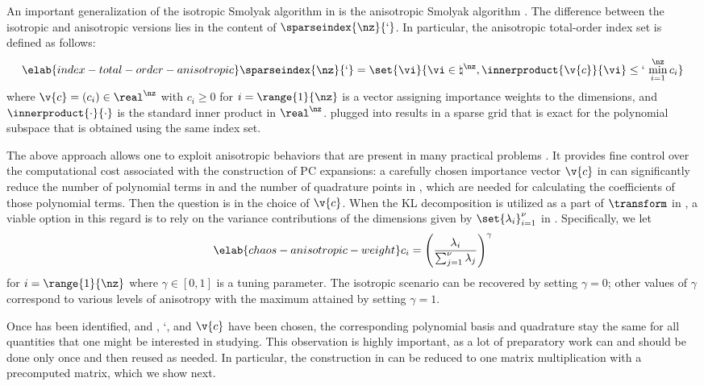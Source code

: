 An important generalization of the isotropic Smolyak algorithm in
 is the anisotropic Smolyak algorithm \cite{nobile2008}.
The difference between the isotropic and anisotropic versions lies in the
content of $\sparseindex{\nz}{\lq}$. In particular, the anisotropic total-order
index set is defined as follows:
\begin{equation} \elab{index-total-order-anisotropic}
  \sparseindex{\nz}{\lq} = \set{\vi}{\vi \in \natural^\nz, \innerproduct{\v{c}}{\vi} \leq \lq \, \min_{i = 1}^\nz c_i}
\end{equation}
where $\v{c} = (c_i) \in \real^\nz$ with $c_i \geq 0$ for $i = \range{1}{\nz}$
is a vector assigning importance weights to the dimensions, and
$\innerproduct{\cdot}{\cdot}$ is the standard inner product in $\real^\nz$.
 plugged into 
results in a sparse grid that is exact for the polynomial subspace that is
obtained using the same index set.

The above approach allows one to exploit anisotropic behaviors that are present
in many practical problems \cite{nobile2008}. It provides fine control over the
computational cost associated with the construction of \ac{PC} expansions: a
carefully chosen importance vector $\v{c}$ in
 can significantly reduce the number of
polynomial terms in  and the number of quadrature points
in , which are needed for calculating the coefficients
of those polynomial terms. Then the question is in the choice of $\v{c}$. When
the \ac{KL} decomposition is utilized as a part of $\transform$ in
, a viable option in this regard is to rely on the
variance contributions of the dimensions given by $\set{\lambda_i}_{i = 1}^\nu$
in . Specifically, we let
\begin{equation} \elab{chaos-anisotropic-weight}
  c_i = \left(\frac{\lambda_i}{\sum_{j = 1}^\nu \lambda_j}\right)^\gamma
\end{equation}
for $i = \range{1}{\nz}$ where $\gamma \in [0, 1]$ is a tuning parameter. The
isotropic scenario can be recovered by setting $\gamma = 0$; other values of
$\gamma$ correspond to various levels of anisotropy with the maximum attained by
setting $\gamma = 1$.

Once \vz has been identified, and \lc, \lq, and $\v{c}$ have been chosen, the
corresponding polynomial basis and quadrature stay the same for all quantities
that one might be interested in studying. This observation is highly important,
as a lot of preparatory work can and should be done only once and then reused as
needed. In particular, the construction in  can be reduced
to one matrix multiplication with a precomputed matrix, which we show next.

